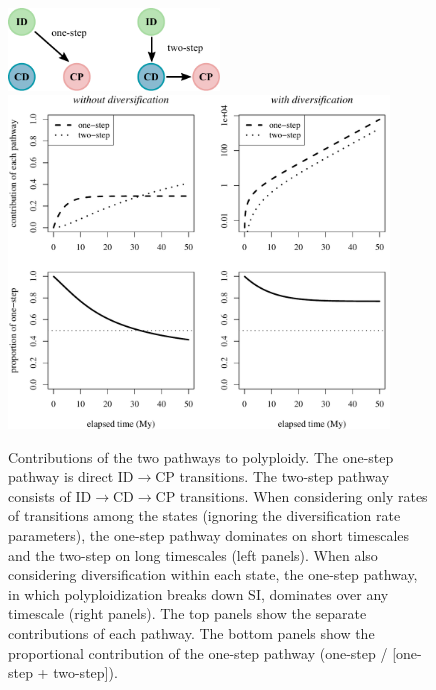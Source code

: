 \begin{figure}
    \includegraphics[width=0.5\textwidth]{fig4a} \\ [40pt] 
        \includegraphics[width=0.9\textwidth]{fig4b}
    \caption{
        Contributions of the two pathways to polyploidy.
        The one-step pathway is direct ID$\rightarrow$CP transitions.
        The two-step pathway consists of ID$\rightarrow$CD$\rightarrow$CP transitions.
        When considering only rates of transitions among the states (ignoring the diversification rate parameters), the one-step pathway dominates on short timescales and the two-step on long timescales (left panels).
        When also considering diversification within each state, the one-step pathway, in which polyploidization breaks down SI, dominates over any timescale (right panels).
        The top panels show the separate contributions of each pathway.
        The bottom panels show the proportional contribution of the one-step pathway (\ie one-step / [one-step + two-step]).
    }
    \label{figure:pathways}
\end{figure}


